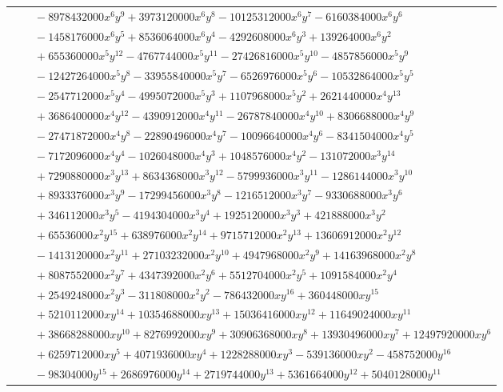 \documentclass[11pt]{article}
\begin{document}
\begin{longtable}{@{}ll@{}}
 & $\quad -8978432000x^{6}y^{9}+3973120000x^{6}y^{8}-10125312000x^{6}y^{7}-6160384000x^{6}y^{6}$\\
 & $\quad -1458176000x^{6}y^{5}+8536064000x^{6}y^{4}-4292608000x^{6}y^{3}+139264000x^{6}y^{2}$\\
 & $\quad +655360000x^{5}y^{12}-4767744000x^{5}y^{11}-27426816000x^{5}y^{10}-4857856000x^{5}y^{9}$\\
 & $\quad -12427264000x^{5}y^{8}-33955840000x^{5}y^{7}-6526976000x^{5}y^{6}-10532864000x^{5}y^{5}$\\
 & $\quad -2547712000x^{5}y^{4}-4995072000x^{5}y^{3}+1107968000x^{5}y^{2}+2621440000x^{4}y^{13}$\\
 & $\quad +3686400000x^{4}y^{12}-4390912000x^{4}y^{11}-26787840000x^{4}y^{10}+8306688000x^{4}y^{9}$\\
 & $\quad -27471872000x^{4}y^{8}-22890496000x^{4}y^{7}-10096640000x^{4}y^{6}-8341504000x^{4}y^{5}$\\
 & $\quad -7172096000x^{4}y^{4}-1026048000x^{4}y^{3}+1048576000x^{4}y^{2}-131072000x^{3}y^{14}$\\
 & $\quad +7290880000x^{3}y^{13}+8634368000x^{3}y^{12}-5799936000x^{3}y^{11}-1286144000x^{3}y^{10}$\\
 & $\quad +8933376000x^{3}y^{9}-17299456000x^{3}y^{8}-1216512000x^{3}y^{7}-9330688000x^{3}y^{6}$\\
 & $\quad +346112000x^{3}y^{5}-4194304000x^{3}y^{4}+1925120000x^{3}y^{3}+421888000x^{3}y^{2}$\\
 & $\quad +65536000x^{2}y^{15}+638976000x^{2}y^{14}+9715712000x^{2}y^{13}+13606912000x^{2}y^{12}$\\
 & $\quad -1413120000x^{2}y^{11}+27103232000x^{2}y^{10}+4947968000x^{2}y^{9}+14163968000x^{2}y^{8}$\\
 & $\quad +8087552000x^{2}y^{7}+4347392000x^{2}y^{6}+5512704000x^{2}y^{5}+1091584000x^{2}y^{4}$\\
 & $\quad +2549248000x^{2}y^{3}-311808000x^{2}y^{2}-786432000xy^{16}+360448000xy^{15}$\\
 & $\quad +5210112000xy^{14}+10354688000xy^{13}+15036416000xy^{12}+11649024000xy^{11}$\\
 & $\quad +38668288000xy^{10}+8276992000xy^{9}+30906368000xy^{8}+13930496000xy^{7}+12497920000xy^{6}$\\
 & $\quad +6259712000xy^{5}+4071936000xy^{4}+1228288000xy^{3}-539136000xy^{2}-458752000y^{16}$\\
 & $\quad -98304000y^{15}+2686976000y^{14}+2719744000y^{13}+5361664000y^{12}+5040128000y^{11}$\\

\end{longtable}
\end{document}
